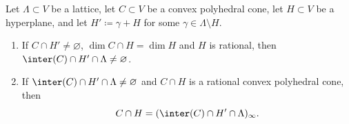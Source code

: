 \begin{proposition}
\label{prop.Weights_facet}
Let $\Lambda \subset V$ be a lattice, let $C \subset V$ be a convex polyhedral cone,
let $H \subset V$ be a hyperplane, and let $H' \coloneqq \gamma + H$ for some
$\gamma \in \Lambda \setminus H$.
\begin{enumerate}
\item
\label{prop.Weights_facet1}
If $C \cap H' \neq \varnothing$, $\dim C \cap H = \dim H$ and $H$ is rational, then
$\inter(C) \cap H' \cap \Lambda \neq \varnothing$.
\item
\label{prop.Weights_facet2}
If $\inter(C) \cap H' \cap \Lambda \neq \varnothing$ and
$C \cap H$ is a rational convex polyhedral cone, then
\[
C \cap H = (\inter(C) \cap H' \cap \Lambda)_{\infty}.
\]
\end{enumerate}
\end{proposition}

